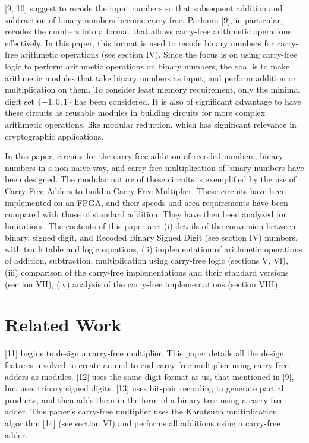 \documentclass[conference]{IEEEtran}
\begin{document}
[9, 10] suggest to recode the input numbers so that subsequent addition and subtraction of binary numbers become carry-free. Parhami [9], in particular, recodes the numbers into a format that allows carry-free arithmetic operations effectively. In this paper, this format is used to recode binary numbers for carry-free arithmetic operations (see section IV). Since the focus is on using carry-free logic to perform arithmetic operations on binary numbers, the goal is to make arithmetic modules that take binary numbers as input, and perform addition or multiplication on them. To consider least memory requirement, only the minimal digit set $\{-1, 0, 1\}$ has been considered. It is also of significant advantage to have these circuits as reusable modules in building circuits for more complex arithmetic operations, like modular reduction, which has significant relevance in cryptographic applications.

In this paper, circuits for the carry-free addition of recoded numbers, binary numbers in a non-naive way, and carry-free multiplication of binary numbers have been designed. The modular nature of these circuits is exemplified by the use of Carry-Free Adders to build a Carry-Free Multiplier. These circuits have been implemented on an FPGA, and their speeds and area requirements have been compared with those of standard addition. They have then been analyzed for limitations. The contents of this paper are: (i) details of the conversion between binary, signed digit, and Recoded Binary Signed Digit (see section IV) numbers, with truth table and logic equations, (ii) implementation of arithmetic operations of addition, subtraction, multiplication using carry-free logic (sections V, VI), (iii) comparison of the carry-free implementations and their standard versions (section VII), (iv) analysis of the carry-free implementations (section VIII).


\section{Related Work}

[11] begins to design a carry-free multiplier. This paper details all the design features involved to create an end-to-end carry-free multiplier using carry-free adders as modules. [12] uses the same digit format as us, that mentioned in [9], but uses trinary signed digits. [13] uses bit-pair recording to generate partial products, and then adds them in the form of a binary tree using a carry-free adder. This paper's carry-free multiplier uses the Karatsuba multiplication algorithm [14] (see section VI) and performs all additions using a carry-free adder.
\end{document}
